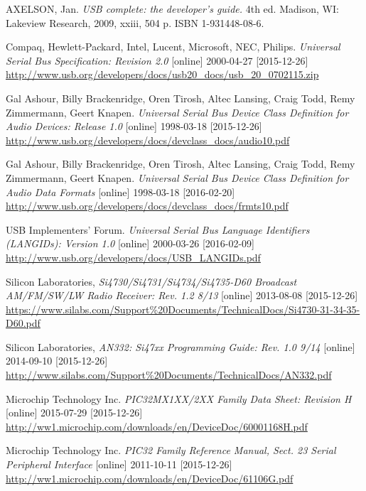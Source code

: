 \documentclass[bc,male,c,dept460]{diploma}						%
\begin{document}
\begin{thebibliography}{99}

 AXELSON, Jan. 
\textit{USB complete: the developer's guide.} 4th ed. Madison, WI: Lakeview Research, 2009, xxiii, 504 p. ISBN 1-931448-08-6.

 Compaq, Hewlett-Packard, Intel, Lucent, Microsoft, NEC, Philips. 
\textit{Universal Serial Bus Specification: Revision 2.0} [online] 2000-04-27 [2015-12-26]
\url{http://www.usb.org/developers/docs/usb20_docs/usb_20_0702115.zip}

 Gal Ashour, Billy Brackenridge, Oren Tirosh, Altec Lansing, Craig Todd, Remy Zimmermann, Geert Knapen. 
\textit{Universal Serial Bus Device Class Definition for Audio Devices: Release 1.0} [online] 1998-03-18 [2015-12-26]
\url{http://www.usb.org/developers/docs/devclass_docs/audio10.pdf}

 Gal Ashour, Billy Brackenridge, Oren Tirosh, Altec Lansing, Craig Todd, Remy Zimmermann, Geert Knapen. 
\textit{Universal Serial Bus Device Class Definition for Audio Data Formats} [online] 1998-03-18 [2016-02-20]
\url{http://www.usb.org/developers/docs/devclass_docs/frmts10.pdf}

  USB Implementers’ Forum. 
\textit{Universal Serial Bus Language Identifiers (LANGIDs): Version 1.0} [online] 2000-03-26 [2016-02-09]
\url{http://www.usb.org/developers/docs/USB_LANGIDs.pdf}

 Silicon Laboratories,
\textit{Si4730/Si4731/Si4734/Si4735-D60 Broadcast AM/FM/SW/LW Radio Receiver: Rev. 1.2 8/13} [online] 2013-08-08 [2015-12-26] \url{https://www.silabs.com/Support\%20Documents/TechnicalDocs/Si4730-31-34-35-D60.pdf}

 Silicon Laboratories,
\textit{AN332: Si47xx Programming Guide: Rev. 1.0 9/14 } [online] 2014-09-10 [2015-12-26] \url{http://www.silabs.com/Support\%20Documents/TechnicalDocs/AN332.pdf}

 Microchip Technology Inc.
\textit{PIC32MX1XX/2XX Family Data Sheet: Revision H} [online] 2015-07-29 [2015-12-26]
\url{http://ww1.microchip.com/downloads/en/DeviceDoc/60001168H.pdf}

 Microchip Technology Inc.
\textit{PIC32 Family Reference Manual, Sect. 23 Serial Peripheral Interface} [online] 2011-10-11 [2015-12-26]
\url{http://ww1.microchip.com/downloads/en/DeviceDoc/61106G.pdf}


\end{thebibliography}
\end{document}
